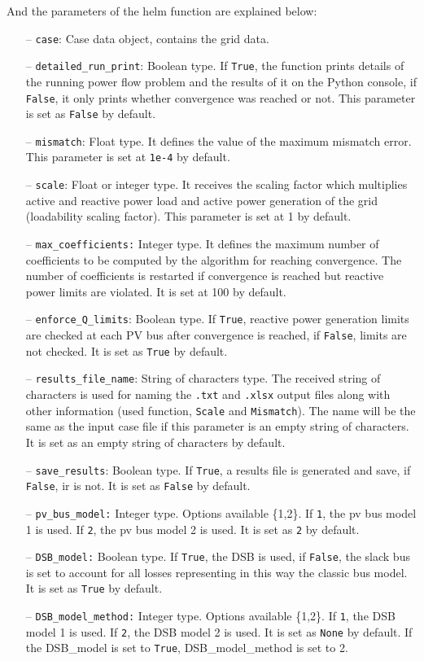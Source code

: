 \documentclass[12pt]{article}
\begin{document}
And the parameters of the helm function are explained below:
%
\begin{itemize}
	\item[--] \texttt{case}: Case data object, contains the grid data.
	\item[--] \texttt{detailed_run_print}: Boolean type. If \texttt{True}, the function prints details of the running power flow problem and the results of it on the Python console, if \texttt{False}, it only prints whether convergence was reached or not. This parameter is set as \texttt{False} by default.
	\item[--] \texttt{mismatch}: Float type. It defines the value of the maximum mismatch error. This parameter is set at \texttt{1e-4} by default.
	\item[--] \texttt{scale}: Float or integer type. It receives the scaling factor which multiplies active and reactive power load and active power generation of the grid (loadability scaling factor). This parameter is set at 1 by default.
	\item[--] \texttt{max_coefficients:} Integer type. It defines the maximum number of coefficients to be computed by the algorithm for reaching convergence. The number of coefficients is restarted if convergence is reached but reactive power limits are violated. It is set at 100 by default.
	\item[--] \texttt{enforce_Q_limits}: Boolean type. If \texttt{True}, reactive power generation limits are checked at each PV bus after convergence is reached, if \texttt{False}, limits are not checked. It is set as \texttt{True} by default.
	\item[--] \texttt{results_file_name}: String of characters type. The received string of characters is used for naming the \texttt{.txt} and \texttt{.xlsx} output files along with other information (used function, \texttt{Scale} and \texttt{Mismatch}). The name will be the same as the input case file if this parameter is an empty string of characters. It is set as an empty string of characters by default.
	\item[--] \texttt{save_results}: Boolean type. If \texttt{True}, a results file is generated and save, if \texttt{False}, ir is not. It is set as \texttt{False} by default.
	\item[--] \texttt{pv_bus_model:} Integer type. Options available \{1,2\}. If \texttt{1}, the pv bus model 1 is used. If \texttt{2}, the pv bus model 2 is used. It is set as \texttt{2} by default.
	\item[--] \texttt{DSB_model:} Boolean type. If \texttt{True}, the DSB is used, if \texttt{False}, the slack bus is set to account for all losses representing in this way the classic bus model. It is set as \texttt{True} by default.
	\item[--] \texttt{DSB_model_method:} Integer type. Options available \{1,2\}. If \texttt{1}, the DSB model 1 is used. If \texttt{2}, the DSB model 2 is used. It is set as \texttt{None} by default. If the DSB_model is set to \texttt{True}, DSB_model_method is set to 2.
\end{itemize}
\end{document}

